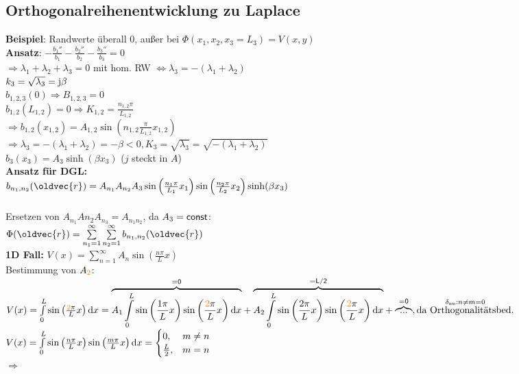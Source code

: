 \documentclass[6pt,a4paper]{scrartcl}
\let\vec\oldvec
\begin{document}
\begin{multicols}{4}
	\subsection{Orthogonalreihenentwicklung zu Laplace}
	\textbf{Beispiel}: Randwerte überall 0, außer bei $\Phi(x_1,x_2,x_3=L_3)=V(x,y)$\\
	\textbf{Ansatz}: $-\frac{b_1''}{b_1} -\frac{b_2''}{b_2}-\frac{b_3''}{b_3}=0$\\
	$\Rightarrow \lambda_1+\lambda_2+\lambda_3 = 0$ mit hom. RW $\Leftrightarrow \lambda_3 = -(\lambda_1+\lambda_2)$\\
	$k_3 = \sqrt{\lambda_3} = \mathrm{j}\beta$\\
	$b_{1,2,3}(0)\Rightarrow B_{1,2,3}=0$\\
	$b_{1,2}(L_{1,2})=0\Rightarrow K_{1,2}=\frac{n_{1,2}\pi}{L_{1,2}}$\\
	$\Rightarrow b_{1,2}(x_{1,2}) = A_{1,2}\sin\left(n_{1,2}\frac{\pi}{L_{1,2}}x_{1,2}\right)$\\
	$\Rightarrow \lambda_3 = -(\lambda_1+\lambda_2) = -\beta < 0, K_3=\sqrt{\lambda_3}=\sqrt{-(\lambda_1+\lambda_2)}$\\
	$b_3(x_3)=A_3\sinh(\beta x_3)$ ($j$ steckt in $A$)\\
	\textbf{Ansatz für DGL:}\\
	$b_{n_1,n_2}(\vec{r}) = A_{n_1}A_{n_2}A_3\sin\left(\frac{n_1\pi}{L_1}x_1\right)\sin\left(\frac{n_2\pi}{L_2}x_2\right)\sinh(\beta x_3)$\\ \\
	Ersetzen von $A_{n_1}A{n_2}A_{n_3} = A_{n_1n_2}$, da $A_3 = \sf const$:\\
	$\Phi(\vec{r}) = \sum\limits_{n_1=1}^{\infty}\sum\limits_{n_2=1}^{\infty}b_{n_1,n_2}(\vec{r})$\\
	\textbf{1D Fall:} $V(x)=\sum\limits_{n=1}^{\infty}A_n\sin\left(\frac{n\pi}{L}x\right)$\\
	Bestimmung von $A_{\textcolor{orange}{2}}$:\\
	$V(x) = \int\limits_0^{L}\sin\left(\frac{\textcolor{orange}{2}\pi}{L}x\right)\diff x = \overset{\ir =0}{\overbrace{A_1\int\limits_0^{L}\sin\left(\frac{1\pi}{L}x\right)\sin\left(\frac{\textcolor{orange}{2}\pi}{L}x\right)\diff x}} + \overset{\ir =L/2}{\overbrace{A_2\int\limits_0^{L}\sin\left(\frac{2\pi}{L}x\right)\sin\left(\frac{\textcolor{orange}{2}\pi}{L}x\right)\diff x}} + \overset{\ir =0}{\overbrace{...}}, \overset{\delta_{\ir nm}: n\neq m = 0}{\text{da Orthogonalitätsbed.}}$\\
	$V(x) = \int\limits_0^{L}\sin\left(\frac{n\pi}{L}x\right)\sin\left(\frac{m\pi}{L}x\right)\diff x = \begin{cases}0, &m\neq n\\\frac{L}{2}, &m=n\end{cases}$\\
	$\Rightarrow$ 
	\columnbreak

\end{multicols}
\end{document}
